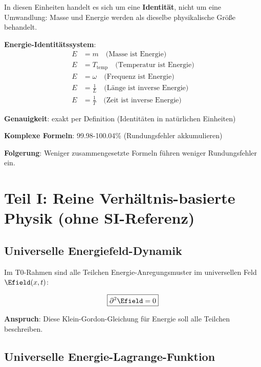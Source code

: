 	In diesen Einheiten handelt es sich um eine \textbf{Identität}, nicht um eine Umwandlung: Masse und Energie werden als dieselbe physikalische Größe behandelt.
	
	\begin{tcolorbox}[colback=blue!5!white,colframe=blue!75!black,title=Universelle Energie-Beziehungen]
		\textbf{Energie-Identitätssystem}:
		\begin{align}
			E &= m \quad \text{(Masse ist Energie)} \\
			E &= T_{\text{temp}} \quad \text{(Temperatur ist Energie)} \\
			E &= \omega \quad \text{(Frequenz ist Energie)} \\
			E &= \frac{1}{L} \quad \text{(Länge ist inverse Energie)} \\
			E &= \frac{1}{T} \quad \text{(Zeit ist inverse Energie)}
		\end{align}
		
		\textbf{Genauigkeit}: exakt per Definition (Identitäten in natürlichen Einheiten)
		
		\textbf{Komplexe Formeln}: 99.98-100.04\% (Rundungsfehler akkumulieren)
		
		\textbf{Folgerung}: Weniger zusammengesetzte Formeln führen weniger Rundungsfehler ein.
	\end{tcolorbox}
	
	\section{Teil I: Reine Verhältnis-basierte Physik (ohne SI-Referenz)}
	
	\subsection{Universelle Energiefeld-Dynamik}
	
	Im T0-Rahmen sind alle Teilchen Energie-Anregungsmuster im universellen Feld $\Efield(x,t)$:
	
	\begin{equation}
		\boxed{\partial^2 \Efield = 0}
		\label{eq:universal_field_equation}
	\end{equation}
	
	\textbf{Anspruch}: Diese Klein-Gordon-Gleichung für Energie soll alle Teilchen beschreiben.
	
	\subsection{Universelle Energie-Lagrange-Funktion}
	
